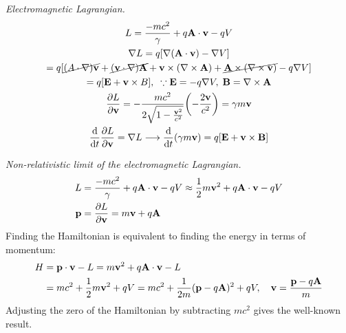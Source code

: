\documentclass{report}
\begin{document}
\begin{subquests}
	\item \emph{Electromagnetic Lagrangian.}
	\begin{gather*}
		L = \frac{-mc^2}{\gamma} + q{\vb A}\cdot{\vb v} - qV \\
		\nabla{L} = q\bqty{\nabla\pqty{{\vb A}\cdot {\vb v}} - \nabla V} \\
		= q\bqty{\cancel{\vb(A \cdot \nabla)\vb v} + \cancel{(\vb v \cdot \nabla)\vb A} + {\vb v \times (\nabla \times \vb A)} + \cancel{\vb A \times (\nabla \times \vb v)} - q\nabla V} \\
		= q\bqty{\vb E + \vb v \times B},\;\;\because {\vb E} = -q\nabla V, \; \vb B = \nabla \times \vb A\\
		\pdv{L}{\vb v} = -\frac{mc^2}{2\sqrt{1- \frac{{\vb v}^2}{c^2}}}\pqty{-\frac{2\vb v}{c^2}} = \gamma m {\vb v} \\
		\dv{t}\pdv{L}{\vb v} = \nabla L \longrightarrow \dv{t}(\gamma m \vb v) = q\bqty{\vb E + \vb v \times \vb B}
	\end{gather*}

	\item \emph{Non-relativistic limit of the electromagnetic Lagrangian.}
	\begin{align*}
		L & = \frac{-mc^2}{\gamma} + q{\vb A}\cdot{\vb v} - qV \approx \frac{1}{2}m{\vb v}^2 + q{\vb A}\cdot{\vb v} - qV \\
		{\vb p} & = \pdv{L}{\vb v} = m{\vb v} + q{\vb A}
	\end{align*}
	Finding the Hamiltonian is equivalent to finding the energy in terms of momentum:
	\begin{align*}
		H & = {\vb p\cdot \vb v} - L = m{\vb v}^2 + q{\vb A \cdot \vb v} - L \\ 
		& = mc^2 + \frac{1}{2}m{\vb v}^2 + qV = mc^2 + \frac{1}{2m}({\vb p} - q{\vb A})^2 + qV, \quad {\vb v} = \frac{{\vb p} - q{\vb A}}{m}
	\end{align*}
	Adjusting the zero of the Hamiltonian by subtracting $mc^2$ gives the well-known result.


\end{subquests}
\end{document}
